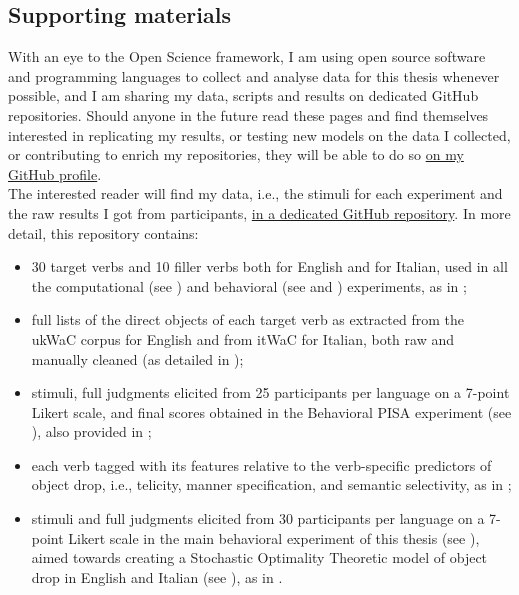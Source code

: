 \subsection{Supporting materials} 
With an eye to the Open Science framework, I am using open source software and programming languages to collect and analyse data for this thesis whenever possible, and I am sharing my data, scripts and results on dedicated GitHub repositories. Should anyone in the future read these pages and find themselves interested in replicating my results, or testing new models on the data I collected, or contributing to enrich my repositories, they will be able to do so \href{https://github.com/giuliacappelli}{on my GitHub profile}.\\ %
The interested reader will find my data, i.e., the stimuli for each experiment and the raw results I got from participants, \href{https://github.com/giuliacappelli/dissertationData}{in a dedicated GitHub repository}. In more detail, this repository contains:
\begin{itemize}
    \item 30 target verbs and 10 filler verbs both for English and for Italian, used in all the computational (see ) and behavioral (see  and ) experiments, as in ;
    \item full lists of the direct objects of each target verb as extracted from the ukWaC corpus for English and from itWaC for Italian, both raw and manually cleaned (as detailed in );
    \item stimuli, full judgments elicited from 25 participants per language on a 7-point Likert scale, and final scores obtained in the Behavioral PISA experiment (see ), also provided in ;
    \item each verb tagged with its features relative to the verb-specific predictors of object drop, i.e., telicity, manner specification, and semantic selectivity, as in ;
    \item stimuli and full judgments elicited from 30 participants per language on a 7-point Likert scale in the main behavioral experiment of this thesis (see ), aimed towards creating a Stochastic Optimality Theoretic model of object drop in English and Italian (see ), as in .
\end{itemize}
